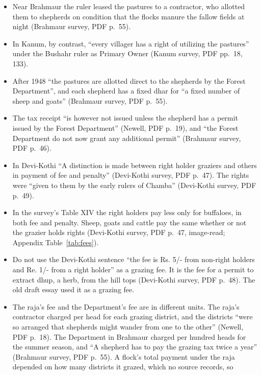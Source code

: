\documentclass[11pt,a4paper]{article}
\newcommand{\cit}[1]{{\small(#1)}}
\begin{document}
\begin{itemize}
{  rajah of Chamba to the highest bidder, who was usually a Gaddi} \cit{Newell,
  PDF p.~18}.
\item Near Brahmaur the ruler leased the pastures to a contractor, who allotted
  them to shepherds on condition that the flocks manure the fallow fields at
  night \cit{Brahmaur survey, PDF p.~55}.
\item In Kanum, by contrast, \enquote{every villager has a right of utilizing the
  pastures} under the Bushahr ruler as Primary Owner \cit{Kanum survey, PDF
  pp.~18, 133}.
\item After 1948 \enquote{the pastures are allotted direct to the shepherds by the
  Forest Department}, and each shepherd has a fixed dhar for \enquote{a fixed
  number of sheep and goats} \cit{Brahmaur survey, PDF p.~55}.
\item The tax receipt \enquote{is however not issued unless the shepherd has a
  permit issued by the Forest Department} \cit{Newell, PDF p.~19}, and
  \enquote{the Forest Department do not now grant any additional permit}
  \cit{Brahmaur survey, PDF p.~46}.
\item In Devi-Kothi \enquote{A distinction is made between right holder graziers
  and others in payment of fee and penalty} \cit{Devi-Kothi survey, PDF
  p.~47}. The rights were \enquote{given to them by the early rulers of Chamba}
  \cit{Devi-Kothi survey, PDF p.~49}.
\item In the survey's Table XIV the right holders pay less only for buffaloes,
  in both fee and penalty. Sheep, goats and cattle pay the same whether or not
  the grazier holds rights \cit{Devi-Kothi survey, PDF p.~47, image-read;
  Appendix Table~\ref{tab:fees}}.
\item Do not use the Devi-Kothi sentence \enquote{the fee is Rs. 5/- from
  non-right holders and Re. 1/- from a right holder} as a grazing fee. It is
  the fee for a permit to extract dhup, a herb, from the hill tops
  \cit{Devi-Kothi survey, PDF p.~48}. The old draft essay used it as a grazing
  fee.
\item The raja's fee and the Department's fee are in different units. The raja's
  contractor charged per head for each grazing district, and the districts
  \enquote{were so arranged that shepherds might wander from one to the other}
  \cit{Newell, PDF p.~18}. The Department in Brahmaur charged per hundred heads
  for the summer season, and \enquote{A shepherd has to pay the grazing tax twice
  a year} \cit{Brahmaur survey, PDF p.~55}. A flock's total payment under the
  raja depended on how many districts it grazed, which no source records, so

\end{itemize}
\end{document}
